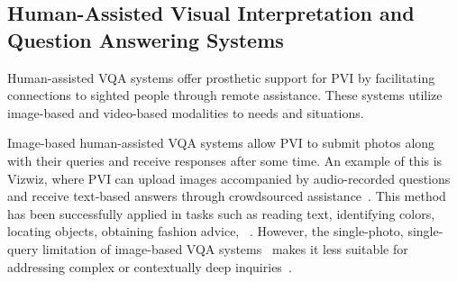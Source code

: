 







\subsection{Human-Assisted Visual Interpretation and Question Answering Systems}

Human-assisted VQA systems offer prosthetic support for PVI by facilitating connections to sighted people through remote assistance. These systems utilize image-based and video-based modalities to  needs and situations.


Image-based human-assisted VQA systems allow PVI to submit photos along with their queries and receive responses after some time. An example of this is Vizwiz, where PVI can upload images accompanied by audio-recorded questions and receive text-based answers through crowdsourced assistance~\cite{bigham2010vizwiz_nearly}. This method has been successfully applied in tasks such as reading text, identifying colors, locating objects, obtaining fashion advice, ~\cite{bigham2010vizwiz_nearly, bigham2010vizwiz, burton2012crowdsourcing,gurari2018vizwiz}. 
However, the single-photo, single-query limitation of image-based VQA systems~\cite{bigham2010vizwiz_nearly} makes it less suitable for addressing complex or contextually deep inquiries~\cite{lasecki2013answering}.



